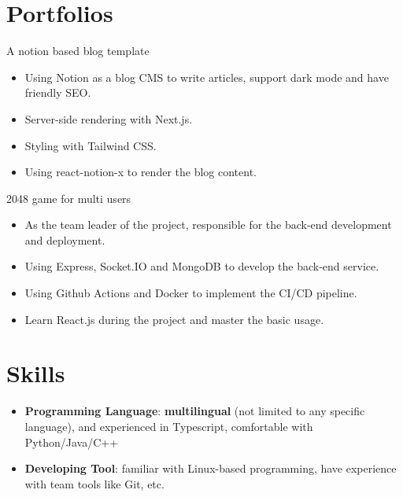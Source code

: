 \documentclass{resume}
\newcommand{\en}[1]{#1}
\newcommand{\zh}[1]{}
\begin{document}
\section{\en{Portfolios}\zh{个人项目}}
\en{A notion based blog template}
\zh{基于 Notion 的个人博客模板}
\begin{itemize}
      \item \en{Using Notion as a blog CMS to write articles, support dark mode and have friendly SEO.}
            \zh{使用 Notion 作为 CMS 发表博客，支持黑暗模式和良好的 SEO}
      \item \en{Server-side rendering with Next.js.}
            \zh{使用 Next.js 实现服务端渲染}
      \item \en{Styling with Tailwind CSS.}
            \zh{使用 Tailwind CSS 进行样式编写}
      \item \en{Using react-notion-x to render the blog content.}
            \zh{使用 react-notion-x 渲染博客内容}
\end{itemize}

\en{}
\zh{\datedsubsection{\textbf{字节跳动前端训练营}}{2020/11 -- 2020/12}}
\en{2048 game for multi users}
\zh{2048 多人在线小游戏}
\begin{itemize}
      \item \en{As the team leader of the project, responsible for the back-end development and deployment.}
            \zh{作为项目的组长, 负责项目的后端开发以及前后端整合上线}
      \item \en{Using Express, Socket.IO and MongoDB to develop the back-end service.}
            \zh{使用 Express, Socket.IO 以及 MongoDB 进行后端开发}
      \item \en{Using Github Actions and Docker to implement the CI/CD pipeline.}
            \zh{使用 Github Actions 和 Docker 实现前后端的 CI/CD}
      \item \en{Learn React.js during the project and master the basic usage.}
            \zh{在项目中自学 React.js 并掌握基本使用}
\end{itemize}

\section{\en{Skills}\zh{技能}}
\begin{itemize}[parsep=0.25ex]
      \item \en{\textbf{Programming Language}: \textbf{multilingual} (not limited to any specific language), and experienced in Typescript, comfortable with Python/Java/C++}
            \zh{\textbf{编程语言}: \textbf{泛语言}（编程不受特定语言限制），熟悉 Typescript，了解 Python/Java/C++ 等}
      \item \en{\textbf{Developing Tool}: familiar with Linux-based programming, have experience with team tools like Git, etc.}
            \zh{\textbf{开发工具}: 熟悉 Linux，有 Git 等团队协作工具的使用经验}
\end{itemize}
\end{document}
